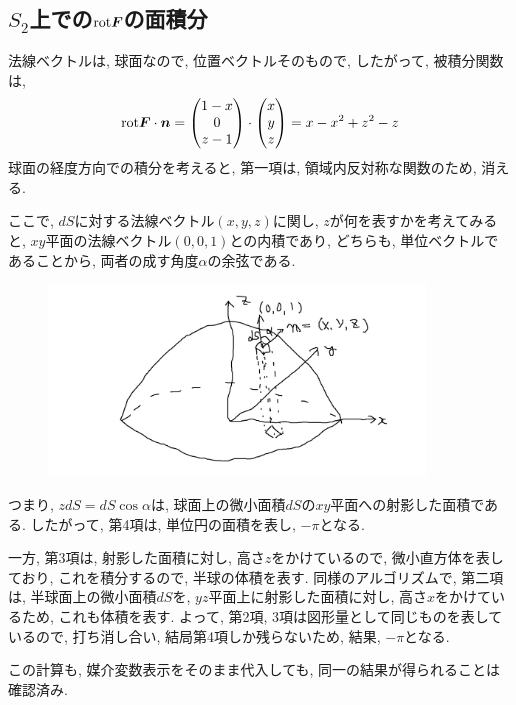 \documentclass{jsarticle} \usepackage[dvipdfmx]{graphicx} \usepackage[dvipdfmx]{hyperref}
\newcommand*{\mbold}[1]{\mbox{\boldmath $#1$}}
\newcommand*{\rot}{{\rm rot}}
\begin{document}
\subsection*{$S_2$上での$\rot\mbold{F}$の面積分}
法線ベクトルは, 球面なので, 位置ベクトルそのもので, したがって, 被積分関数は, 
\begin{equation}
  \rot\mbold{F} \cdot \mbold{n} = 
  \begin{pmatrix}
    1 - x \\
    0 \\
    z - 1 \\
  \end{pmatrix}
  \cdot
  \begin{pmatrix}
    x \\
    y \\
    z \\
  \end{pmatrix}
  = x - x^2 + z^2 - z
\end{equation}
球面の経度方向での積分を考えると, 第一項は, 領域内反対称な関数のため, 消える. 

ここで, $dS$に対する法線ベクトル$(x, y, z)$に関し, $z$が何を表すかを考えてみると, 
$xy$平面の法線ベクトル$(0, 0, 1)$との内積であり, どちらも, 単位ベクトルであることから, 両者の成す角度$\alpha$の余弦である. 
\begin{figure}[htbp]
  \begin{center}
    \includegraphics[width = 10cm]{Figure/zdS.png}
  \end{center}
\end{figure}

つまり, $z dS = dS \cos\alpha$は, 球面上の微小面積$dS$の$xy$平面への射影した面積である. 
したがって, 第4項は, 単位円の面積を表し, $-\pi$となる. 

一方, 第3項は, 射影した面積に対し, 高さ$z$をかけているので, 微小直方体を表しており, これを積分するので, 半球の体積を表す. 
同様のアルゴリズムで, 第二項は, 半球面上の微小面積$dS$を, $yz$平面上に射影した面積に対し, 高さ$x$をかけているため, これも体積を表す. 
よって, 第2項, 3項は図形量として同じものを表しているので, 打ち消し合い, 結局第4項しか残らないため, 
結果, $-\pi$となる. 

この計算も, 媒介変数表示をそのまま代入しても, 同一の結果が得られることは確認済み. 
\end{document}
